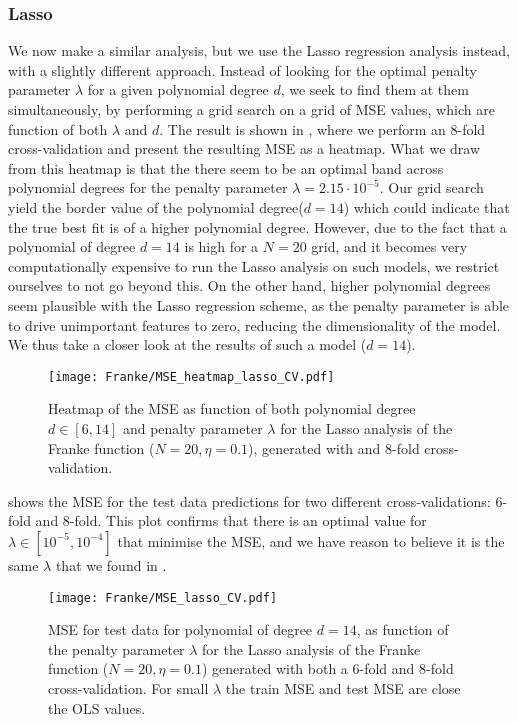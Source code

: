         \subsubsection{Lasso}\label{sec:lassoanalysis}

        We now make a similar analysis, but we use the Lasso regression analysis instead, with a slightly different approach. Instead of looking for the optimal penalty parameter $\lambda$ for a given polynomial degree $d$, we seek to find them at them simultaneously, by performing a grid search on a grid of MSE values, which are function of both $\lambda$ and $d$. The result is shown in , where we perform an 8-fold cross-validation and present the resulting MSE as a heatmap. 
        What we draw from this heatmap is that the there seem to be an optimal band across polynomial degrees for the penalty parameter $\lambda =2.15\cdot10^{-5}$. Our grid search yield the border value of the polynomial degree($d=14$) which could indicate that the true best fit is of a higher polynomial degree. However, due to the fact that a polynomial of degree $d=14$ is high for a $N=20$ grid, and it becomes very computationally expensive to run the Lasso analysis on such models, we restrict ourselves to not go beyond this. On the other hand, higher polynomial degrees seem plausible with the Lasso regression scheme, as the penalty parameter is able to drive unimportant features to zero, reducing the dimensionality of the model. We thus take a closer look at the results of such a model ($d=14$). 

        \begin{figure}
            \texttt{[image: Franke/MSE\_heatmap\_lasso\_CV.pdf]}
            \caption{Heatmap of the MSE as function of both polynomial degree $d\in[6,14]$ and penalty parameter $\lambda$ for the Lasso analysis of the Franke function ($N=20, \eta=0.1$), generated with and 8-fold cross-validation.}
            \label{fig:gridsearch_cv_lasso}
        \end{figure}

         shows the MSE for the test data predictions for two different cross-validations: 6-fold and 8-fold. This plot confirms that there is an optimal value for $\lambda\in[10^{-5}, 10^{-4}]$ that minimise the MSE, and we have reason to believe it is the same $\lambda$ that we found in .

        \begin{figure} 
            \texttt{[image: Franke/MSE\_lasso\_CV.pdf]}
            \caption{MSE for test data for polynomial of degree $d=14$, as function of the penalty parameter $\lambda$ for the Lasso analysis of the Franke function ($N=20, \eta=0.1$) generated with both a 6-fold and 8-fold cross-validation. For small $\lambda$ the train MSE and test MSE are close the OLS values.}
            \label{fig:cross-validation_lasso}
        \end{figure}


